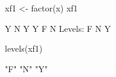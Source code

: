\begin{Schunk}
\begin{Sinput}
  xf1 <- factor(x)
  xf1
\end{Sinput}
\begin{Soutput}
[1] Y N Y Y F N
Levels: F N Y
\end{Soutput}
\begin{Sinput}
  levels(xf1)
\end{Sinput}
\begin{Soutput}
[1] "F" "N" "Y"
\end{Soutput}
\end{Schunk}
